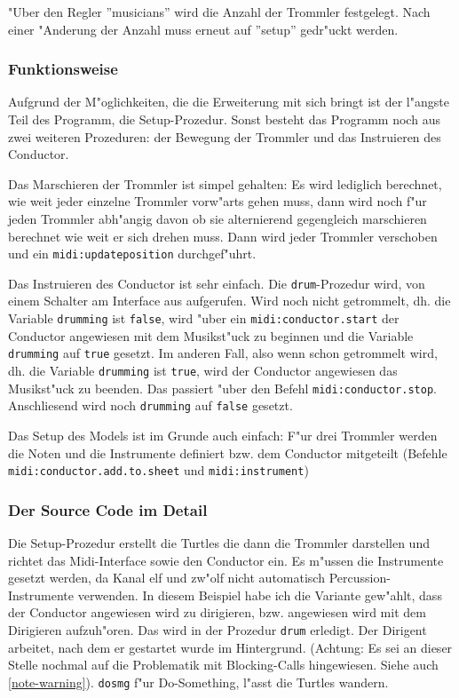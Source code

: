 "Uber den Regler ''musicians'' wird die Anzahl der Trommler festgelegt. Nach 
einer "Anderung der Anzahl muss erneut auf ''setup'' gedr"uckt werden. 

\subsubsection{Funktionsweise}
Aufgrund der M"oglichkeiten, die die Erweiterung mit sich bringt ist der l"angste
Teil des Programm, die Setup-Prozedur. Sonst besteht das Programm noch aus zwei
weiteren Prozeduren: der Bewegung der Trommler und das Instruieren des Conductor.

Das Marschieren der Trommler ist simpel gehalten: Es wird lediglich berechnet,
wie weit jeder einzelne Trommler vorw"arts gehen muss, dann wird noch f"ur jeden
Trommler abh"angig davon ob sie alternierend gegengleich marschieren berechnet
wie weit er sich drehen muss. Dann wird jeder Trommler verschoben und ein
\lstinline|midi:updateposition| durchgef"uhrt. 

Das Instruieren des Conductor ist sehr einfach. Die \lstinline|drum|-Prozedur wird, von
einem Schalter am Interface aus aufgerufen. Wird noch nicht getrommelt, dh. die
Variable \lstinline|drumming| ist \lstinline|false|, wird 
"uber ein \lstinline|midi:conductor.start| der Conductor angewiesen mit dem
Musikst"uck zu beginnen und die Variable \lstinline|drumming| auf 
\lstinline|true| gesetzt. Im anderen Fall, also wenn schon getrommelt wird,
dh. die Variable \lstinline|drumming| ist \lstinline|true|, wird der Conductor
angewiesen das Musikst"uck zu beenden. Das passiert "uber den Befehl 
\lstinline|midi:conductor.stop|. Anschliesend wird noch \lstinline|drumming| auf
\lstinline|false| gesetzt. 

Das Setup des Models ist im Grunde auch einfach: F"ur drei Trommler werden die
Noten und die Instrumente definiert bzw. dem Conductor mitgeteilt (Befehle
\lstinline|midi:conductor.add.to.sheet| und \lstinline|midi:instrument|)


\subsubsection{Der Source Code im Detail}
Die Setup-Prozedur erstellt die Turtles die dann die Trommler darstellen und 
richtet das Midi-Interface sowie den Conductor ein. Es m"ussen die Instrumente
gesetzt werden, da Kanal elf und zw"olf nicht automatisch Percussion-Instrumente
verwenden. In diesem Beispiel habe ich die Variante gew"ahlt, dass der Conductor
angewiesen wird zu dirigieren, bzw. angewiesen wird mit dem Dirigieren 
aufzuh"oren. Das wird in der Prozedur \lstinline|drum| erledigt. Der Dirigent
arbeitet, nach dem er gestartet wurde im Hintergrund. (Achtung: Es sei an dieser
Stelle nochmal auf die Problematik mit Blocking-Calls hingewiesen. 
Siehe auch \ref{note-warning}). \lstinline|dosmg| f"ur Do-Something, l"asst
die Turtles wandern. 

